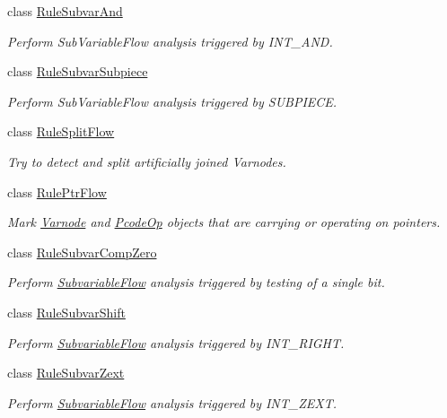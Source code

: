 \begin{DoxyCompactItemize}
class \mbox{\hyperlink{class_rule_subvar_and}{Rule\+Subvar\+And}}
\begin{DoxyCompactList}\small\item\em Perform Sub\+Variable\+Flow analysis triggered by I\+N\+T\+\_\+\+A\+ND. \end{DoxyCompactList}\item 
class \mbox{\hyperlink{class_rule_subvar_subpiece}{Rule\+Subvar\+Subpiece}}
\begin{DoxyCompactList}\small\item\em Perform Sub\+Variable\+Flow analysis triggered by S\+U\+B\+P\+I\+E\+CE. \end{DoxyCompactList}\item 
class \mbox{\hyperlink{class_rule_split_flow}{Rule\+Split\+Flow}}
\begin{DoxyCompactList}\small\item\em Try to detect and split artificially joined Varnodes. \end{DoxyCompactList}\item 
class \mbox{\hyperlink{class_rule_ptr_flow}{Rule\+Ptr\+Flow}}
\begin{DoxyCompactList}\small\item\em Mark \mbox{\hyperlink{class_varnode}{Varnode}} and \mbox{\hyperlink{class_pcode_op}{Pcode\+Op}} objects that are carrying or operating on pointers. \end{DoxyCompactList}\item 
class \mbox{\hyperlink{class_rule_subvar_comp_zero}{Rule\+Subvar\+Comp\+Zero}}
\begin{DoxyCompactList}\small\item\em Perform \mbox{\hyperlink{class_subvariable_flow}{Subvariable\+Flow}} analysis triggered by testing of a single bit. \end{DoxyCompactList}\item 
class \mbox{\hyperlink{class_rule_subvar_shift}{Rule\+Subvar\+Shift}}
\begin{DoxyCompactList}\small\item\em Perform \mbox{\hyperlink{class_subvariable_flow}{Subvariable\+Flow}} analysis triggered by I\+N\+T\+\_\+\+R\+I\+G\+HT. \end{DoxyCompactList}\item 
class \mbox{\hyperlink{class_rule_subvar_zext}{Rule\+Subvar\+Zext}}
\begin{DoxyCompactList}\small\item\em Perform \mbox{\hyperlink{class_subvariable_flow}{Subvariable\+Flow}} analysis triggered by I\+N\+T\+\_\+\+Z\+E\+XT. \end{DoxyCompactList}\item 

\end{DoxyCompactItemize}
